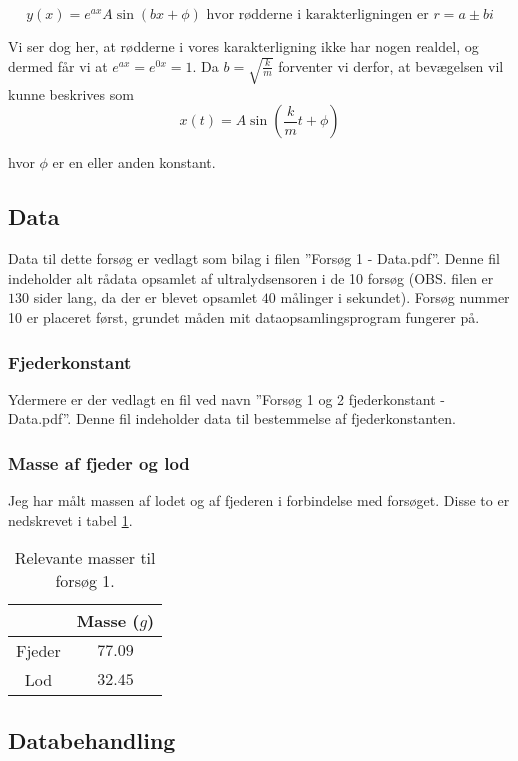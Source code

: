 $$y(x) = e^{ax}A\sin(bx+\phi) \text{ hvor rødderne i karakterligningen er } r = a \pm bi$$

Vi ser dog her, at rødderne i vores karakterligning ikke har nogen realdel, og dermed får vi at $e^{ax}=e^{0x}=1$.
Da $b=\sqrt{\frac{k}{m}}$ forventer vi derfor, at bevægelsen vil kunne beskrives som 
\begin{equation}
x(t)=A\sin (\frac{k}{m}t+\phi)
\label{eq: exp1 hypotese}
\end{equation}

hvor $\phi$ er en eller anden konstant. 


\subsection{Data}\label{exp1: Data}


Data til dette forsøg er vedlagt som bilag i filen ''Forsøg 1 - Data.pdf''.
Denne fil indeholder alt rådata opsamlet af ultralydsensoren i de 10 forsøg (OBS. filen er $130$ sider lang, da der er blevet opsamlet $40$ målinger i sekundet). 
Forsøg nummer 10 er placeret først, grundet måden mit dataopsamlingsprogram fungerer på.

\subsubsection{Fjederkonstant}\label{exp1: Fjederkonstant}
Ydermere er der vedlagt en fil ved navn ''Forsøg 1 og 2 fjederkonstant - Data.pdf''.
Denne fil indeholder data til bestemmelse af fjederkonstanten. 

\subsubsection{Masse af fjeder og lod}\label{exp1: Masse af fjeder og lod}
Jeg har målt massen af lodet og af fjederen i forbindelse med forsøget. 
Disse to er nedskrevet i tabel \ref{tabel: Masser forsog 1}.
\pagebreak
\begin{table}[h]
\centering
\begin{tabular}{|c|c|}
\hline 
 & Masse ($g$) \\ 
\hline 
Fjeder & $77.09$ \\ 
\hline 
Lod & $32.45$ \\ 
\hline 
\end{tabular} 
\caption{Relevante masser til forsøg 1.}
\label{tabel: Masser forsog 1}
\end{table}

\subsection{Databehandling}\label{exp1: databehandling afsnit}
